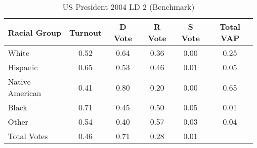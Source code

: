 \begin{table}[htb]
\begin{center}
\caption{US President 2004 LD 2 (Benchmark)}
\label{pres04_vap_ld_2_benchmark}
\begin{tabular}{lccccc}
  \hline
Racial Group & Turnout & D Vote & R Vote & S Vote & Total VAP \\ 
  \hline
White & 0.52 & 0.64 & 0.36 & 0.00 & 0.25 \\ 
  Hispanic & 0.65 & 0.53 & 0.46 & 0.01 & 0.05 \\ 
  Native American & 0.41 & 0.80 & 0.20 & 0.00 & 0.65 \\ 
  Black & 0.71 & 0.45 & 0.50 & 0.05 & 0.01 \\ 
  Other & 0.54 & 0.40 & 0.57 & 0.03 & 0.04 \\ 
  Total Votes & 0.46 & 0.71 & 0.28 & 0.01 &  \\ 
   \hline
\end{tabular}
\end{center}
\end{table}
